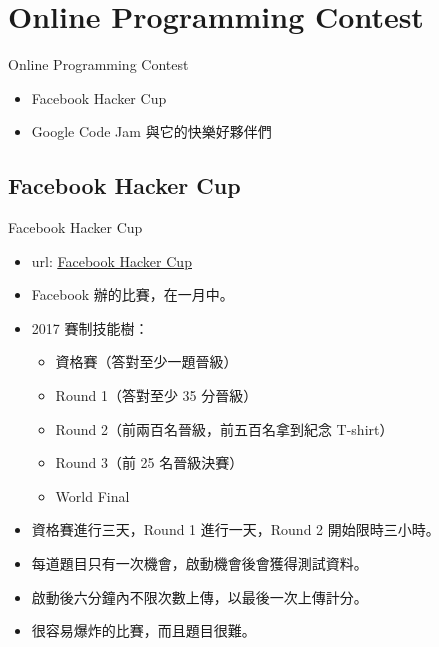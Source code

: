 \documentclass[t]{beamer}
\begin{document}
\section{Online Programming Contest}
\begin{frame}{Online Programming Contest}
  \begin{itemize}
    \item Facebook Hacker Cup
    \item Google Code Jam 與它的快樂好夥伴們
  \end{itemize}
\end{frame}

\subsection{Facebook Hacker Cup}
\begin{frame}{Facebook Hacker Cup}
  \begin{itemize}
    \item url: \href{https://www.facebook.com/hackercup/}{\underline{Facebook Hacker Cup}}
    \item Facebook 辦的比賽，在一月中。
    \item 2017 賽制技能樹：
      \begin{itemize}
        \item 資格賽（答對至少一題晉級）
        \item Round 1（答對至少 35 分晉級）
        \item Round 2（前兩百名晉級，前五百名拿到紀念 T-shirt）
        \item Round 3（前 25 名晉級決賽）
        \item World Final
      \end{itemize}
    \item 資格賽進行三天，Round 1 進行一天，Round 2 開始限時三小時。
    \item 每道題目只有一次機會，啟動機會後會獲得測試資料。
    \item 啟動後六分鐘內不限次數上傳，以最後一次上傳計分。
    \item 很容易爆炸的比賽，而且題目很難。
  \end{itemize}
\end{frame}
\end{document}
